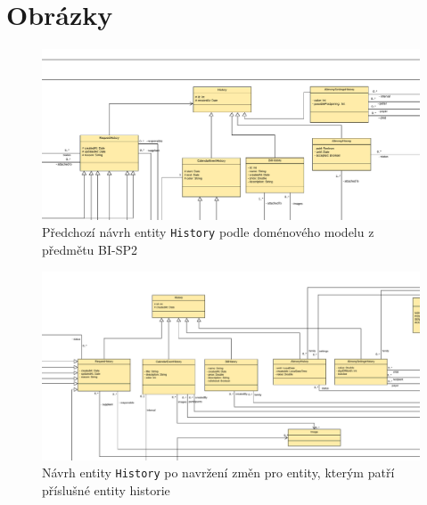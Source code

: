 \chapter{Obrázky}\label{dodatek:images}
    \begin{figure}\centering
        \includegraphics[angle=90, height=1.0\textheight]{pdfs/History1}
        \caption[Předchozí návrh entity \texttt{History}]{Předchozí návrh entity \texttt{History} podle doménového modelu z předmětu BI-SP2}\label{image:History1}
    \end{figure}
    \begin{figure}\centering
        \includegraphics[angle=90, height=1.0\textheight]{pdfs/History1_2}
        \caption[Návrh entity \texttt{History} po změnách návrhu]{Návrh entity \texttt{History} po navržení změn pro entity, kterým patří příslušné entity historie}\label{image:History1_2}
    \end{figure}

